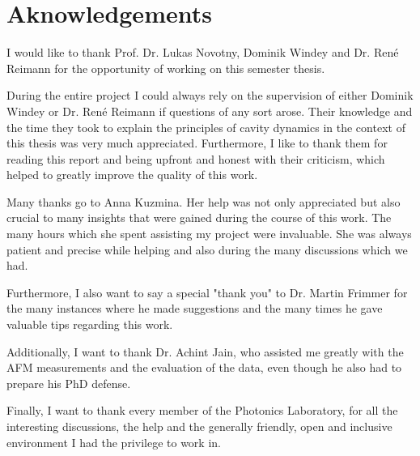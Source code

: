 \cleardoublepage
\thispagestyle{empty}
\section*{Aknowledgements}
I would like to thank Prof. Dr. Lukas Novotny, Dominik Windey and Dr. Ren\'{e} Reimann for the opportunity of working on this semester thesis.

During the entire project I could always rely on the supervision of either Dominik Windey or Dr. Ren\'{e} Reimann if questions of any sort arose. Their knowledge and the time they took to explain the principles of cavity dynamics in the context of this thesis was very much appreciated. Furthermore, I like to thank them for reading this report and being upfront and honest with their criticism, which helped to greatly improve the quality of this work.

Many thanks go to Anna Kuzmina. Her help was not only appreciated but also crucial to many insights that were gained during the course of this work. The many hours which she spent assisting my project were invaluable. She was always patient and precise while helping and also during the many discussions which we had.

Furthermore, I also want to say a special "thank you" to Dr. Martin Frimmer for the many instances where he made suggestions and the many times he gave valuable tips regarding this work.

Additionally, I want to thank Dr. Achint Jain, who assisted me greatly with the AFM measurements and the evaluation of the data, even though he also had to prepare his PhD defense.

Finally, I want to thank every member of the Photonics Laboratory, for all the interesting discussions, the help and the generally friendly, open and inclusive environment I had the privilege to work in.